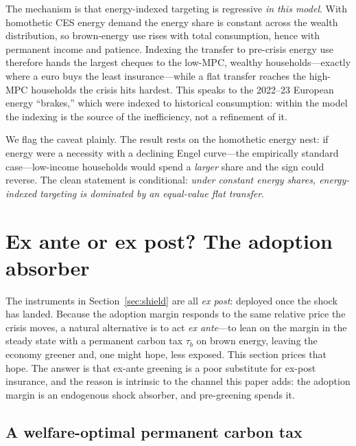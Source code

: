 \documentclass[11pt,a4paper]{article}
\begin{document}
The mechanism is that energy-indexed targeting is regressive \emph{in this model}.
With homothetic CES energy demand the energy share is constant across the wealth
distribution, so brown-energy use rises with total consumption, hence with
permanent income and patience. Indexing the transfer to pre-crisis energy use
therefore hands the largest cheques to the low-MPC, wealthy households---exactly
where a euro buys the least insurance---while a flat transfer reaches the high-MPC
households the crisis hits hardest. This speaks to the 2022--23 European energy
``brakes,'' which were indexed to historical consumption: within the model the
indexing is the source of the inefficiency, not a refinement of it.

We flag the caveat plainly. The result rests on the homothetic energy nest: if
energy were a necessity with a declining Engel curve---the empirically standard
case---low-income households would spend a \emph{larger} share and the sign could
reverse. The clean statement is conditional: \emph{under constant energy shares,
energy-indexed targeting is dominated by an equal-value flat transfer}.




\section{Ex ante or ex post? The adoption absorber}
\label{sec:exante}

The instruments in Section~\ref{sec:shield} are all \emph{ex post}: deployed once
the shock has landed. Because the adoption margin responds to the same relative
price the crisis moves, a natural alternative is to act \emph{ex ante}---to lean
on the margin in the steady state with a permanent carbon tax $\tau_b$ on brown
energy, leaving the economy greener and, one might hope, less exposed. This
section prices that hope. The answer is that ex-ante greening is a poor substitute
for ex-post insurance, and the reason is intrinsic to the channel this paper adds:
the adoption margin is an endogenous shock absorber, and pre-greening spends it.

\subsection{A welfare-optimal permanent carbon tax}
\label{sec:carbontax}
\end{document}
